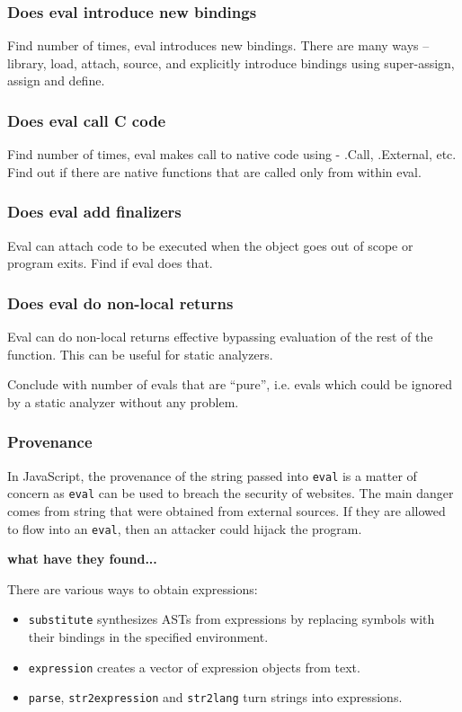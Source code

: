 \documentclass[a4paper,USenglish,cleveref, autoref, thm-restate]{lipics-v2019}
\newcommand{\eval}{\texttt{eval}\xspace}
\renewcommand{\c}[1]{\lstinline{#1}\xspace}
\begin{document}
\subsubsection{Does eval introduce new bindings}
Find number of times, eval introduces new bindings. There are many ways -- library,
load, attach, source, and explicitly introduce bindings using super-assign, assign and define.

\subsubsection{Does eval call C code}
Find number of times, eval makes call to native code using - .Call, .External,
etc. Find out if there are native functions that are called only from within eval.

\subsubsection{Does eval add finalizers}
Eval can attach code to be executed when the object goes out of scope or program
exits. Find if eval does that.

\subsubsection{Does eval do non-local returns}
Eval can do non-local returns effective bypassing evaluation of the rest of the
function. This can be useful for static analyzers.

Conclude with number of evals that are ``pure'', i.e. evals which
could be ignored by a static analyzer without any problem.

\subsubsection{Provenance}

In JavaScript, the provenance of the string passed into \eval is a matter of
concern as \eval can be used to breach the security of websites. The main
danger comes from string that were obtained from external sources. If they
are allowed to flow into an \eval, then an attacker could hijack the
program.

{\bf what have they found...}

There are various ways to obtain expressions:
\begin{itemize}
  \item \c{substitute} synthesizes ASTs from expressions by replacing
    symbols with their bindings in the specified environment.
  \item \c{expression}  creates a vector of expression
    objects from text.
  \item \c{parse}, \c{str2expression} and \c{str2lang} turn strings into
    expressions.
\end{itemize}
\end{document}
